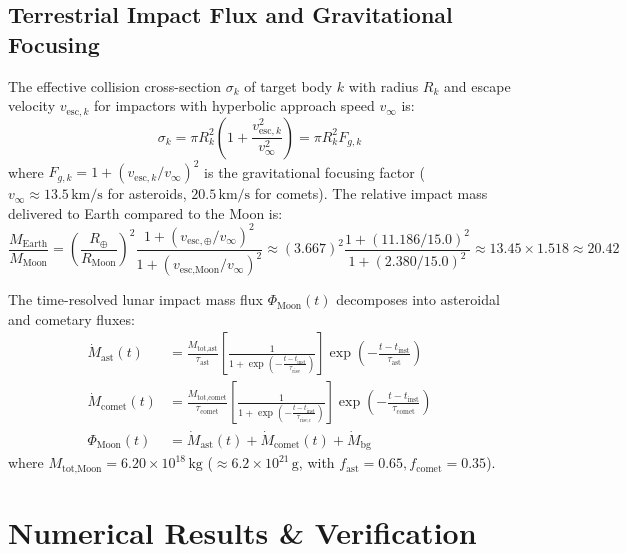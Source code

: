 \documentclass[11pt,a4paper]{article}
\begin{document}
\subsection{Terrestrial Impact Flux and Gravitational Focusing}
The effective collision cross-section $\sigma_k$ of target body $k$ with radius $R_k$ and escape velocity $v_{\text{esc},k}$ for impactors with hyperbolic approach speed $v_\infty$ is:
\begin{equation}
\sigma_k = \pi R_k^2 \left(1 + \frac{v_{\text{esc},k}^2}{v_\infty^2}\right) = \pi R_k^2 F_{g,k}
\end{equation}
where $F_{g,k} = 1 + (v_{\text{esc},k} / v_\infty)^2$ is the gravitational focusing factor ($v_\infty \approx 13.5\,\text{km/s}$ for asteroids, $20.5\,\text{km/s}$ for comets). The relative impact mass delivered to Earth compared to the Moon is:
\begin{equation}
\frac{M_{\text{Earth}}}{M_{\text{Moon}}} = \left(\frac{R_\oplus}{R_{\text{Moon}}}\right)^2 \frac{1 + (v_{\text{esc},\oplus}/v_\infty)^2}{1 + (v_{\text{esc},\text{Moon}}/v_\infty)^2} \approx (3.667)^2 \frac{1 + (11.186/15.0)^2}{1 + (2.380/15.0)^2} \approx 13.45 \times 1.518 \approx 20.42
\end{equation}

The time-resolved lunar impact mass flux $\Phi_{\text{Moon}}(t)$ decomposes into asteroidal and cometary fluxes:
\begin{align}
\dot{M}_{\text{ast}}(t) &= \frac{M_{\text{tot,ast}}}{\tau_{\text{ast}}} \left[\frac{1}{1 + \exp\left(-\frac{t - t_{\text{inst}}}{\tau_{\text{rise}}}\right)}\right] \exp\left(-\frac{t - t_{\text{inst}}}{\tau_{\text{ast}}}\right) \\
\dot{M}_{\text{comet}}(t) &= \frac{M_{\text{tot,comet}}}{\tau_{\text{comet}}} \left[\frac{1}{1 + \exp\left(-\frac{t - t_{\text{inst}}}{\tau_{\text{rise,c}}}\right)}\right] \exp\left(-\frac{t - t_{\text{inst}}}{\tau_{\text{comet}}}\right) \\
\Phi_{\text{Moon}}(t) &= \dot{M}_{\text{ast}}(t) + \dot{M}_{\text{comet}}(t) + \dot{M}_{\text{bg}}
\end{align}
where $M_{\text{tot,Moon}} = 6.20 \times 10^{18}\,\text{kg}$ ($\approx 6.2 \times 10^{21}\,\text{g}$, with $f_{\text{ast}} = 0.65, f_{\text{comet}} = 0.35$).

\section{Numerical Results \& Verification}
\end{document}
